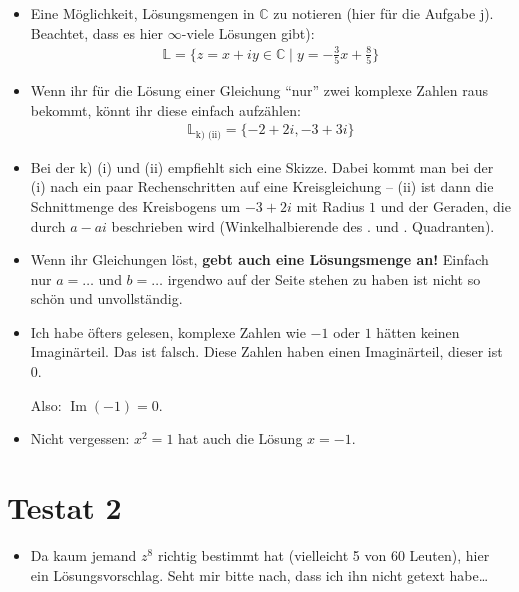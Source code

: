 \documentclass[11pt, a4paper]{article}
\newcommand{\Lsg}{\mathbb{L}}
\newcommand{\C}{\mathbb{C}}
\newcommand{\RM}[1]{\MakeUppercase{\romannumeral #1{}}}
\begin{document}
\begin{itemize}
\item Eine Möglichkeit, Lösungsmengen in $\C$ zu notieren (hier für die Aufgabe j). Beachtet, dass es hier $\infty$-viele Lösungen gibt):
\begin{align*}
\Lsg = \{ z = x  + iy \in \C \mid y = -\frac{3}{5}x + \frac{8}{5}\}
\end{align*}

\item Wenn ihr für die Lösung einer Gleichung \enquote{nur} zwei komplexe Zahlen raus bekommt, könnt ihr diese einfach aufzählen:
\begin{align*}
\Lsg_{\text{k) (ii)}} = \{ -2 + 2i, -3 + 3i\}
\end{align*}

\item Bei der k) (i) und (ii) empfiehlt sich eine Skizze. Dabei kommt man bei der (i) nach ein paar Rechenschritten auf eine Kreisgleichung -- (ii) ist dann die Schnittmenge des Kreisbogens um $-3 + 2i$ mit Radius $1$ und der Geraden, die durch $a - ai$ beschrieben wird (Winkelhalbierende des \RM{2}. und \RM{4}. Quadranten).

\item Wenn ihr Gleichungen löst, \textbf{gebt auch eine Lösungsmenge an!} Einfach nur $a = \dots$ und $b = \dots$ irgendwo auf der Seite stehen zu haben ist nicht so schön und unvollständig.

\item Ich habe öfters gelesen, komplexe Zahlen wie $-1$ oder $1$ hätten keinen Imaginärteil. Das ist falsch. Diese Zahlen haben einen Imaginärteil, dieser ist 0. 

Also: $\operatorname{Im}(-1) = 0$. 

\item Nicht vergessen: $x^2 = 1$ hat auch die Lösung $x = -1$.
\end{itemize}




\newpage
\section*{Testat 2}
\begin{itemize}
\item Da kaum jemand $z^8$ richtig bestimmt hat (vielleicht 5 von 60 Leuten), hier ein Lösungsvorschlag. Seht mir bitte nach, dass ich ihn nicht getext habe\dots \smiley{}
\end{itemize}
\end{document}
